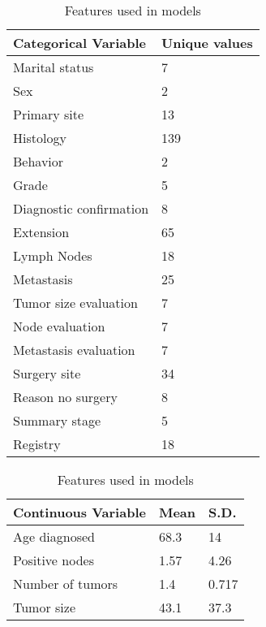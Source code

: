 \documentclass[review]{elsarticle}
\begin{document}
\begin{table}[H]
	\centering
	\caption{Features used in models}
	\tiny
	\begin{tabular}{ll}
		\textbf{Categorical Variable} & \textbf{Unique values}  \\ 
		\hline
		Marital status    & 7                       \\
		Sex               & 2                       \\
		Primary site      & 13                      \\
		Histology         & 139                     \\
		Behavior          & 2                       \\
		Grade             & 5                       \\
		Diagnostic confirmation  & 8                       \\
		Extension         & 65                      \\
		Lymph Nodes       & 18                      \\
		Metastasis        & 25                      \\
		Tumor size evaluation  & 7                       \\
		Node evaluation        & 7                       \\
		Metastasis evaluation  & 7                       \\
		Surgery site      & 34                      \\
		Reason no surgery & 8                       \\
		Summary stage     & 5                       \\
		Registry          & 18                      \\
	\end{tabular}
	\quad
	\centering
	\begin{tabular}{lll}
		\textbf{Continuous Variable} & \textbf{Mean} & \textbf{S.D.}  \\ 
		\hline
		Age diagnosed     & 68.3          & 14             \\
		Positive nodes    & 1.57          & 4.26           \\
		Number of tumors  & 1.4           & 0.717          \\
		Tumor size        & 43.1          & 37.3          
	\end{tabular}
	
	\label{variable-info}
\end{table}
\end{document}
